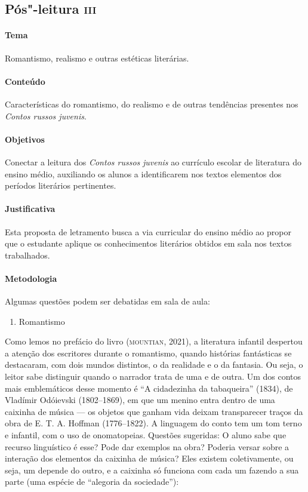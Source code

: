 \documentclass[11pt]{extarticle}
\begin{document}
\subsection{Pós"-leitura \textsc{iii}}

\paragraph{Tema} Romantismo, realismo e outras estéticas literárias.


\paragraph{Conteúdo}
Características do romantismo, do realismo e de outras tendências
presentes nos \emph{Contos russos juvenis}.

\paragraph{Objetivos}
Conectar a leitura dos \emph{Contos russos} \emph{juvenis} ao currículo
escolar de literatura do ensino médio, auxiliando os alunos a
identificarem nos textos elementos dos períodos literários pertinentes.

\paragraph{Justificativa}
Esta proposta de letramento busca a via curricular do ensino médio ao
propor que o estudante aplique os conhecimentos literários obtidos em
sala nos textos trabalhados.

\paragraph{Metodologia}
Algumas questões podem ser debatidas em sala de aula:

\begin{enumerate}
\item Romantismo
\end{enumerate}

Como lemos no prefácio do livro (\textsc{mountian}, 2021), a literatura
infantil despertou a atenção dos escritores durante o romantismo, quando
histórias fantásticas se destacaram, com dois mundos distintos, o da
realidade e o da fantasia. Ou seja, o leitor sabe distinguir quando o
narrador trata de uma e de outra. Um dos contos mais emblemáticos desse
momento é ``A cidadezinha da tabaqueira'' (1834), de Vladímir Odóievski
(1802--1869), em que um menino entra dentro de uma caixinha de música
--- os objetos que ganham vida deixam transparecer traços da obra de E.
T. A. Hoffman (1776--1822). A linguagem do conto tem um tom terno e
infantil, com o uso de onomatopeias. Questões sugeridas: O aluno sabe
que recurso linguístico é esse? Pode dar exemplos na obra? Poderia
versar sobre a interação dos elementos da caixinha de música? Eles
existem coletivamente, ou seja, um depende do outro, e a caixinha só
funciona com cada um fazendo a sua parte (uma espécie de ``alegoria da
sociedade''):
\end{document}
